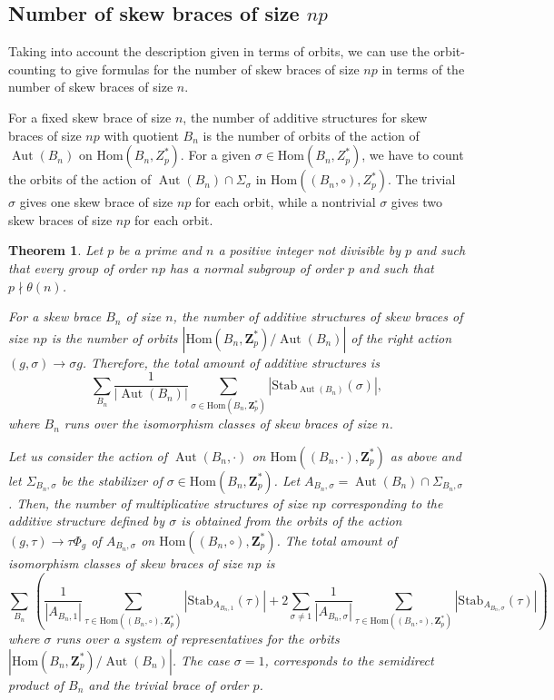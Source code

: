 \documentclass[12pt]{article}
\newtheorem{theorem}{Theorem}[section]
\theoremstyle{definition}
\newcommand{\Z}{\mathbf Z}
\newcommand{\Stab}{\mathrm{Stab}}
\newcommand{\Hom}{\mathrm{Hom}}
\newcommand{\Aut}{\operatorname{Aut}}
\begin{document}
	\subsection{Number of skew braces of size $np$}
	
	Taking into account the description given in terms of orbits, we can use the orbit-counting to give formulas for the number of skew braces of size $np$ in terms of the number of skew braces of size $n$.
    
    For a fixed skew brace of size $n$, the number of additive structures for skew braces of size $np$ with quotient $B_n$ is the number of orbits of the action of $\Aut(B_n)$ on $\Hom(B_n, Z_p^*)$. 
    For a given $\sigma\in \Hom(B_n, Z_p^*)$, we have to count 
    the orbits of the action of 
    $\Aut(B_n)\cap \Sigma_{\sigma}$ in $\Hom((B_n,\circ), Z_p^*)$.
    The trivial $\sigma$ gives one skew brace of size $np$ for each orbit, while a nontrivial $\sigma$ gives two skew braces of size $np$ for each orbit.
	
	\begin{theorem}
		Let $p$ be a prime and $n$ a positive integer not divisible by $p$ and such that every group of order $np$ has a normal subgroup of order $p$ and such that $p\nmid \theta(n)$.
        
	  For a skew brace $B_n$ of size $n$, the number of additive structures of skew braces of size $np$ is the number of orbits $|\Hom(B_n,\Z_p^*)/\Aut(B_n)|$ of the right action $(g,\sigma)\to \sigma g$. Therefore, the total amount of additive structures is 
		$$
		\sum_{B_n}   \dfrac{1}{|\Aut(B_n)|}\sum_{\sigma\in \Hom(B_n,\Z_p^*)}|\Stab_{\Aut(B_n)}(\sigma)|,
		$$
		where $B_n$ runs over the isomorphism classes of skew braces of size $n$. 
        
         Let us consider the action of $\Aut(B_n,\cdot) $ on $\Hom((B_n,\cdot),\Z_p^*)$ as above and let $\Sigma_{B_n,\sigma}$ be the stabilizer of $\sigma\in \Hom(B_n,\Z_p^*)$. Let $A_{B_n,\sigma}=\Aut(B_n)\cap \Sigma_{B_n,\sigma}$. Then, the number of multiplicative structures of size $np$ corresponding to the additive structure defined by $\sigma$ is obtained from the orbits of the action $(g,\tau)\to \tau\Phi_g$ of $A_{B_n,\sigma}$ on $\Hom((B_n,\circ),\Z_p^*)$.
        The total amount of isomorphism classes of skew braces of size $np$ is
		$$
		\sum_{B_n}\,
		\left(
		\dfrac{1}{|A_{B_n,1}|}\sum_{\tau\in \Hom((B_n,\circ),\Z_p^*)}
		|\Stab_{A_{B_n,1}}(\tau)|
		+2\sum_{\sigma\ne 1}
		\dfrac{1}{|A_{B_n,\sigma}|}\sum_{\tau\in \Hom((B_n,\circ),\Z_p^*)}
		|\Stab_{A_{B_n,\sigma}}(\tau)|\right)
		$$
		where $\sigma$ runs over a system of representatives 
        for the orbits $|\Hom(B_n,\Z_p^*)/\Aut(B_n)|$.
        The case $\sigma=1$, corresponds to the semidirect product of $B_n$ and the trivial brace of order $p$. 
	\end{theorem}		
\end{document}
